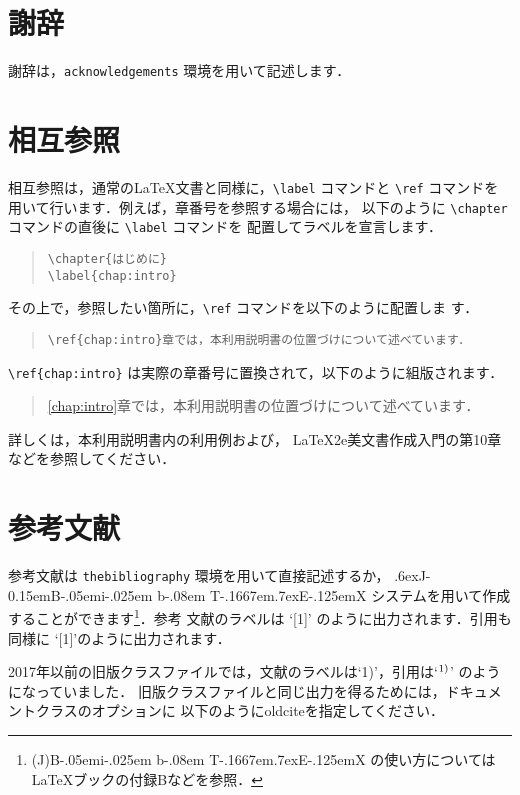 \documentclass{kuee}
\def\BibTeX{{\rm B\kern-.05em{\sc i\kern-.025em b}\kern-.08em
    T\kern-.1667em\lower.7ex\hbox{E}\kern-.125emX}}
\def\JBibTeX{\leavevmode\lower .6ex\hbox{J}\kern-0.15em\BibTeX}
\begin{document}
\section{謝辞}
謝辞は，\verb+acknowledgements+ 環境を用いて記述します．

\section{相互参照}
\label{cross_reference}
相互参照は，通常の\LaTeX{}文書と同様に，\verb+\label+ コマンドと
\verb+\ref+ コマンドを用いて行います．例えば，章番号を参照する場合には，
以下のように \verb+\chapter+ コマンドの直後に \verb+\label+ コマンドを
配置してラベルを宣言します．
\begin{quote}
\begin{verbatim}
\chapter{はじめに}
\label{chap:intro}
\end{verbatim}
\end{quote}
その上で，参照したい箇所に，\verb+\ref+ コマンドを以下のように配置しま
す．
\begin{quote}
\begin{verbatim}
\ref{chap:intro}章では，本利用説明書の位置づけについて述べています．
\end{verbatim}
\end{quote}
\verb+\ref{chap:intro}+ は実際の章番号に置換されて，以下のように組版されます．
\begin{quote}
\ref{chap:intro}章では，本利用説明書の位置づけについて述べています．
\end{quote}
詳しくは，本利用説明書内の利用例および，
\LaTeX2e{}美文書作成入門\cite{GuideBook}の第10章などを参照してください．


\section{参考文献}
参考文献は \verb+thebibliography+ 環境を用いて直接記述するか，
\JBibTeX{} システムを用いて作成することができます\footnote{(J)\BibTeX
の使い方については \LaTeX ブック\cite{LaTeX}の付録Bなどを参照．}．参考
文献のラベルは `[1]' のように出力されます．引用も同様に
`[1]'のように出力されます．

2017年以前の旧版クラスファイルでは，文献のラベルは`1)'，引用は`$^{\mbox{\scriptsize 1)}}$'
のようになっていました．
旧版クラスファイルと同じ出力を得るためには，ドキュメントクラスのオプションに
以下のように{\ttfamily oldcite}を指定してください．
\end{document}
